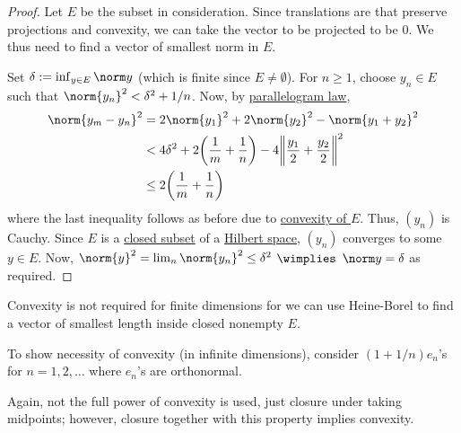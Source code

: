 	\begin{proof}
		Let $E$ be the subset in consideration. Since translations are  that preserve projections and convexity, we can \wlogg take the vector to be projected to be $0$. We thus need to find a vector of smallest norm in $E$.
		
		Set $\delta := \inf_{y\in E}\norm y$ (which is finite since \uline{$E\ne\emptyset$}). For $n\ge 1$, choose
		$y_n\in E$ such that $\norm{y_n}^2 < \delta^2 + 1/n$. Now, by \uline{parallelogram law},
		\begin{align*}
			\norm{y_m - y_n}^2 & = 2\norm{y_1}^2 + 2\norm{y_2}^2 - \norm{y_1 + y_2}^2\\
			& < 4\delta^2 + 2\biggl( \frac{1}{m} + \frac{1}{n} \biggr) - 4\biggl\| \frac{y_1}{2} + \frac{y_2}{2} \biggr\|^2\\
			& \le 2\biggl( \frac{1}{m} + \frac{1}{n} \biggr)
		\end{align*}
		where the last inequality follows as before due to \uline{convexity of $E$}. Thus, $(y_n)$ is Cauchy. Since $E$ is a \uline{closed subset} of a \uline{Hilbert space}, $(y_n)$ converges to some $y\in E$. Now, $\norm{y}^2 = \lim_n \norm{y_n}^2\le \delta^2$ $\wimplies$ $\norm y = \delta$ as required.
	\end{proof}
	
	\begin{rmk}
		\begin{rmklist}
			\item Convexity is not required for finite dimensions for we can use Heine-Borel
			to find a vector of smallest length inside closed nonempty $E$.
			
			\item To show necessity of convexity (in infinite dimensions), consider $(1 + 1/n)e_n$'s for $n = 1, 2, \ldots$ where $e_n$'s are orthonormal.
			
			\item Again, not the full power of convexity is used, just closure under taking midpoints; however, closure together with this property implies convexity.
		\end{rmklist}
	\end{rmk}
	
